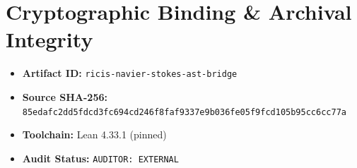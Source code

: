 \documentclass[11pt,a4paper]{article}
\begin{document}
\section{Cryptographic Binding & Archival Integrity}
\begin{itemize}
  \item \textbf{Artifact ID:} \texttt{ricis-navier-stokes-ast-bridge}
  \item \textbf{Source SHA-256:} \texttt{85edafc2dd5fdcd3fc694cd246f8faf9337e9b036fe05f9fcd105b95cc6cc77a}
  \item \textbf{Toolchain:} Lean 4.33.1 (pinned)
  \item \textbf{Audit Status:} \texttt{AUDITOR: EXTERNAL}
\end{itemize}
\end{document}
